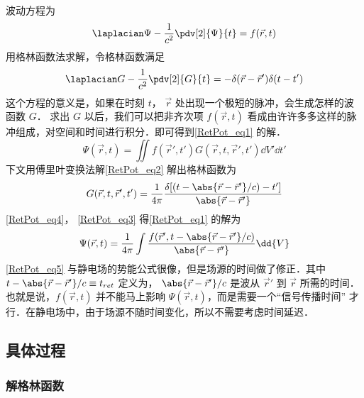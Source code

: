 
波动方程为
\begin{equation}\label{RetPot_eq1}
\laplacian\Psi  - \frac{1}{c^2} \pdv[2]{\Psi}{t} = f(\vec r, t)
\end{equation} 
用格林函数法求解，令格林函数满足
\begin{equation}\label{RetPot_eq2}
\laplacian G - \frac{1}{c^2} \pdv[2]{G}{t} =  - \delta (\vec r - \vec r')\delta (t - t')
\end{equation} 
这个方程的意义是，如果在时刻 $t$， $\vec r$ 处出现一个极短的脉冲，会生成怎样的波函数 $G$． 求出 $G$ 以后，我们可以把非齐次项 $f(\vec r, t)$ 看成由许许多多这样的脉冲组成，对空间和时间进行积分．即可得到\autoref{RetPot_eq1} 的解．
\begin{equation}\label{RetPot_eq3}
\Psi(\vec r, t) = \iint f(\vec r', t')G(\vec r,t, \vec r',t') \dd{V'} \dd{t'} 
\end{equation} 
下文用傅里叶变换法解\autoref{RetPot_eq2} 解出格林函数为
\begin{equation}\label{RetPot_eq4}
G(\vec r, t, \vec r', t') = \frac{1}{4\pi} \frac{\delta [(t - \abs{\vec r - \vec r'}/c) - t']}{\abs{\vec r - \vec r'}}
\end{equation} 
\autoref{RetPot_eq4}， \autoref{RetPot_eq3} 得\autoref{RetPot_eq1} 的解为
\begin{equation}\label{RetPot_eq5}
\Psi(\vec r, t) = \frac{1}{4\pi } \int \frac{f(\vec r',t - \abs{\vec r - \vec r'}/c)}{\abs{\vec r - \vec r'}} \dd{V}
\end{equation} 
\autoref{RetPot_eq5} 与静电场的势能公式很像，但是场源的时间做了修正．其中 $t - \abs{\vec r - \vec r'}/c \equiv t_{ret}$ 定义为， $\abs{\vec r - \vec r'}/c$ 是波从 $\vec r'$ 到 $\vec r$ 所需的时间．也就是说，$f(\vec r, t)$ 并不能马上影响 $\Psi(\vec r, t)$，而是需要一个“信号传播时间” 才行．在静电场中，由于场源不随时间变化，所以不需要考虑时间延迟．

\subsection{具体过程}

\subsubsection{解格林函数}  

